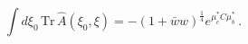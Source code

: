 \begin{equation}
\int d\xi _{0}\,\mathrm{Tr}\,\hat{A}(\xi _{0},\xi )=-(1+\bar{w}w)^{\frac{1}{4%
}}e^{\mu _{c}^{\ast }C\mu _{b}^{\ast }}\,.
\end{equation}

